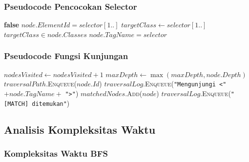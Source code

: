 \documentclass[12pt]{article}
\begin{document}
\subsubsection{Pseudocode Pencocokan Selector}
\begin{algorithm}[H]
\caption{Pencocokan CSS Selector pada Simpul DOM}
\label{alg:matcher}
\begin{algorithmic}[1]
        \State \Return \textbf{false}
    \EndIf
        \State \Return $node.ElementId = selector[1..]$ 
        \State $targetClass \gets selector[1..]$
        \State \Return $targetClass \in node.Classes$ 
    \Else
        \State \Return $node.TagName = selector$ 
    \EndIf
\EndFunction
\end{algorithmic}
\end{algorithm}

\subsubsection{Pseudocode Fungsi Kunjungan}
\begin{algorithm}[H]
\caption{Fungsi Kunjungan Simpul (LogVisit)}
\label{alg:logvisit}
\begin{algorithmic}[1]
    \State $nodesVisited \gets nodesVisited + 1$ 
    \State $maxDepth \gets \max(maxDepth, node.Depth)$ 
    \State $traversalPath$.\textsc{Enqueue}($node.Id$)
    \State $traversalLog$.\textsc{Enqueue}(\texttt{"Mengunjungi <"} $+ node.TagName +$ \texttt{">"})
        \State $matchedNodes$.\textsc{Add}($node$)
        \State $traversalLog$.\textsc{Enqueue}(\texttt{"[MATCH] ditemukan"})
    \EndIf
\EndProcedure
\end{algorithmic}
\end{algorithm}


\subsection{Analisis Kompleksitas Waktu}

\subsubsection{Kompleksitas Waktu BFS}
\end{document}
